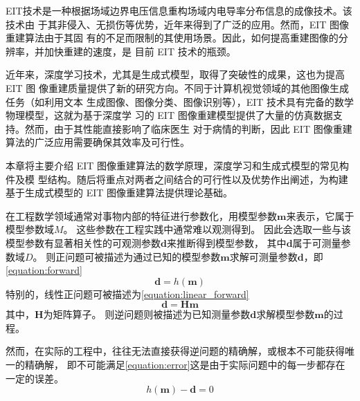 

EIT技术是一种根据场域边界电压信息重构场域内电导率分布信息的成像技术。该技术由
于其非侵入、无损伤等优势，近年来得到了广泛的应用。然而，EIT 图像重建算法由于其固
有的不足而限制的其使用场景。因此，如何提高重建图像的分辨率，并加快重建的速度，是
目前 EIT 技术的瓶颈。

近年来，深度学习技术，尤其是生成式模型，取得了突破性的成果，这也为提高 EIT 图
像重建质量提供了新的研究方向。不同于计算机视觉领域的其他图像生成任务（如利用文本
生成图像、图像分类、图像识别等），EIT 技术具有完备的数学物理模型，这就为基于深度学
习的 EIT 图像重建模型提供了大量的仿真数据支持。然而，由于其性能直接影响了临床医生
对于病情的判断，因此 EIT 图像重建算法的广泛应用需要确保其效率及可行性。

本章将主要介绍 EIT 图像重建算法的数学原理，深度学习和生成式模型的常见构件及模
型结构。随后将重点对两者之间结合的可行性以及优势作出阐述，为构建基于生成式模型的
EIT 图像重建算法提供理论基础。

\label{PrincipleEIT}
在工程数学领域通常对事物内部的特征进行参数化，用模型参数$\boldsymbol{m}$来表示，它属于模型参数域$M$。
这些参数在工程实践中通常难以观测得到。
因此会选取一些与该模型参数有显著相关性的可观测参数$\boldsymbol{d}$来推断得到模型参数，
其中$\boldsymbol{d}$属于可测量参数域$D$。
则正问题可被描述为通过已知的模型参数$\boldsymbol{m}$求解可测量参数$\boldsymbol{d}$，即\cref{equation:forward}
\begin{equation}
  \label{equation:forward}
  \boldsymbol{d} = h(\boldsymbol{m})
\end{equation}
特别的，线性正问题可被描述为\cref{equation:linear_forward}
\begin{equation}
  \label{equation:linear_forward}
  \boldsymbol{d} = \boldsymbol{H}\boldsymbol{m}
\end{equation}
其中，$\boldsymbol{H}$为矩阵算子。
则逆问题则被描述为已知测量参数$\boldsymbol{d}$求解模型参数$\boldsymbol{m}$的过程。

然而，在实际的工程中，往往无法直接获得逆问题的精确解，或根本不可能获得唯一的精确解，
即不可能满足\cref{equation:error}这是由于实际问题中的每一步都存在一定的误差。
\begin{equation}
  \label{equation:error}
  h(\boldsymbol{m}) - \boldsymbol{d} = 0
\end{equation}

